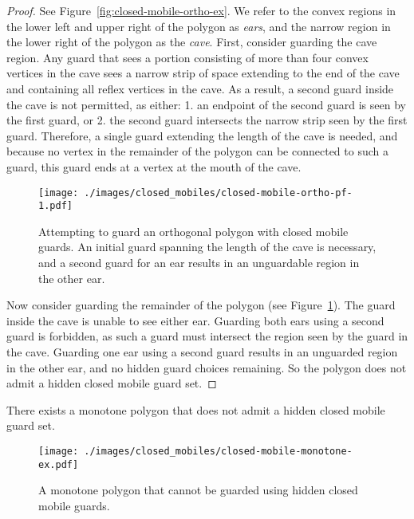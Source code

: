 \documentclass{cccg12}
\begin{document}
\begin{proof}
See Figure~\ref{fig:closed-mobile-ortho-ex}.
We refer to the convex regions in the lower left and upper right of the polygon as \emph{ears}, and the narrow region in the lower right of the polygon as the \emph{cave}.
First, consider guarding the cave region.
Any guard that sees a portion consisting of more than four convex vertices in the cave sees a narrow strip of space extending to the end of the cave and containing all reflex vertices in the cave.
As a result, a second guard inside the cave is not permitted, as either: 1. an endpoint of the second guard is seen by the first guard, or 2. the second guard intersects the narrow strip seen by the first guard.
Therefore, a single guard extending the length of the cave is needed, and because no vertex in the remainder of the polygon can be connected to such a guard, this guard ends at a vertex at the mouth of the cave.

\begin{figure}[ht]
\centering
\texttt{[image: ./images/closed\_mobiles/closed-mobile-ortho-pf-1.pdf]}
\caption{Attempting to guard an orthogonal polygon with closed mobile guards. An initial guard spanning the length of the cave is necessary, and a second guard for an ear results in an unguardable region in the other ear.}
\label{fig:closed-mobile-ortho-pf-1}
\end{figure}

Now consider guarding the remainder of the polygon (see Figure~\ref{fig:closed-mobile-ortho-pf-1}).
The guard inside the cave is unable to see either ear.
Guarding both ears using a second guard is forbidden, as such a guard must intersect the region seen by the guard in the cave.
Guarding one ear using a second guard results in an unguarded region in the other ear, and no hidden guard choices remaining.
So the polygon does not admit a hidden closed mobile guard set.
\end{proof}

\begin{lemma}
There exists a monotone polygon that does not admit a hidden closed mobile guard set.
\end{lemma}

\begin{figure}[ht]
\centering
\texttt{[image: ./images/closed\_mobiles/closed-mobile-monotone-ex.pdf]}
\caption{A monotone polygon that cannot be guarded using hidden closed mobile guards.}
\label{fig:closed-mobile-monotone-ex}
\end{figure}
\end{document}
